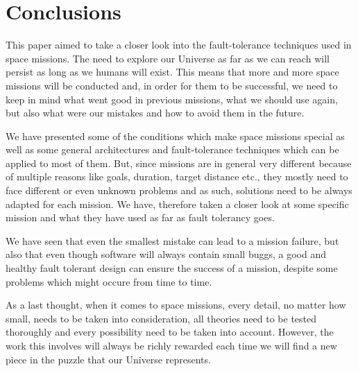 \section{Conclusions}
This paper aimed to take a closer look into the fault-tolerance techniques used
in space missions. The need to explore our Universe as far as we can reach will
persist as long as we humans will exist. This means that more and more space
missions will be conducted and, in order for them to be successful, we need to
keep in mind what went good in previous missions, what we should use again, but
also what were our mistakes and how to avoid them in the future.

We have presented some of the conditions which make space missions special as
well as some general architectures and fault-tolerance techniques which can be
applied to most of them. But, since missions are in general very different
because of multiple reasons like goals, duration, target distance etc., they
mostly need to face different or even unknown problems and as such, solutions
need to be always adapted for each mission. We have, therefore taken a closer
look at some specific mission and what they have used as far as fault tolerancy
goes.

We have seen that even the smallest mistake can lead to a mission failure, but
also that even though software will always contain small buggs, a good and
healthy fault tolerant design can ensure the success of a mission, despite some
problems which might occure from time to time.

As a last thought, when it comes to space missions, every detail, no matter how
small, needs to be taken into consideration, all theories need to be tested
thoroughly and every possibility need to be taken into account. However, the
work this involves will always be richly rewarded each time we will find a new
piece in the puzzle that our Universe represents.
